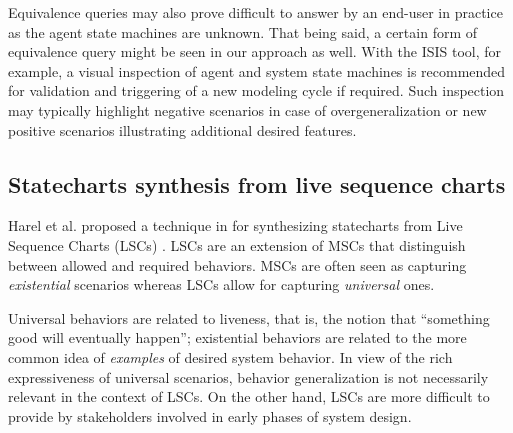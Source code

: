 Equivalence queries may also prove difficult to answer by an end-user in practice as the agent state machines are unknown. That being said, a certain form of equivalence query might be seen in our approach as well. With the ISIS tool, for example, a visual inspection of agent and system state machines is recommended for validation and triggering of a new modeling cycle if required. Such inspection may typically highlight negative scenarios in case of overgeneralization or new positive scenarios illustrating additional desired features. 


\subsection{Statecharts synthesis from live sequence charts}

Harel et al. proposed a technique in \cite{Harel:2005} for synthesizing statecharts from Live Sequence Charts (LSCs) \cite{Damm:2001}. LSCs are an extension of MSCs that distinguish between allowed and required behaviors. MSCs are often seen as capturing \emph{existential} scenarios whereas LSCs allow for capturing \emph{universal} ones. 

Universal behaviors are related to liveness, that is, the notion that ``something good will eventually happen''; existential behaviors are related to the more common idea of \emph{examples} of desired system behavior. In view of the rich expressiveness of universal scenarios, behavior generalization is not necessarily relevant in the context of LSCs. On the other hand, LSCs are more difficult to provide by stakeholders involved in early phases of system design. 

